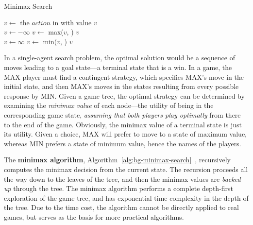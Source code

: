 \begin{algorithm}
\caption{Minimax Search}
\label{alg:bg-minimax-search}
\begin{algorithmic}[1]
   \State $v \leftarrow$ 
   \State \Return the $action$ in  with value $v$
\EndProcedure
\\
   \label{alg:bg-minimax-terminal-max}
     \State \Return {}
  \EndIf
  \State $v \leftarrow -\infty$ 
     \State $v \leftarrow$ max($v$, )
  \EndFor
  \State \Return $v$
\EndProcedure
\\
   \label{alg:bg-minimax-terminal-min}
     \State \Return {}
  \EndIf
  \State $v \leftarrow \infty$ 
     \State $v \leftarrow$ min($v$, )
  \EndFor
  \State \Return $v$
\EndProcedure
\end{algorithmic}
\end{algorithm}

In a single-agent search problem, the optimal solution would be a
sequence of moves leading to a goal state---a terminal state that is a
win. In a game, the MAX player must find a contingent strategy, which
specifies MAX's move in the initial state, and then MAX's moves in the
states resulting from every possible response by MIN. Given a game
tree, the optimal strategy can be determined by examining the {\em
  minimax value} of each node---the utility of being in the
corresponding game state, {\em assuming that both players play
  optimally} from there to the end of the game. Obviously, the minimax
value of  a terminal state is just its utility. Given a choice, MAX
will prefer to move to a state of maximum value, whereas MIN prefers a
state of minimum value, hence the names of the players. 

The {\bf minimax algorithm}, Algorithm~\ref{alg:bg-minimax-search}~\cite{Russell.aima},
recursively computes the minimax decision from the
current state. The recursion proceeds all the way down to the leaves
of the tree, and then the minimax values are {\em backed up} through
the tree.  The minimax algorithm performs a complete depth-first
exploration of the game tree, and has exponential time complexity in
the depth of the tree. Due to the time cost, the algorithm cannot be
directly applied to real games, but serves as the basis for more
practical algorithms. 

